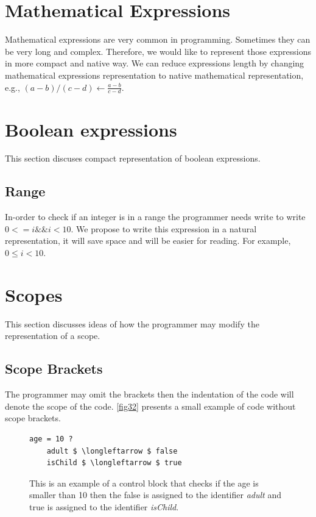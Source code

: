 \section{Mathematical Expressions}
Mathematical expressions are very common in programming. Sometimes they can be very long and complex. Therefore, we would like to represent those expressions in more compact and native way. We can reduce expressions length by changing mathematical expressions representation to native mathematical representation, e.g., $ (a-b)/(c-d) \longleftarrow \frac{a-b}{c-d} $.
\section{Boolean expressions}
This section discuses compact representation of boolean expressions.
\subsection{Range}
In-order to check if an integer is in a range the programmer needs write to write $ 0 <= i \&\& i < 10 $. We propose to write this expression in a natural representation, it will save space and will be easier for reading. For example, $ 0 \leq i < 10 $.
\section{Scopes}
This section discusses ideas of how the programmer may modify the representation of a scope.
\subsection{Scope Brackets}
The programmer may omit the brackets then the indentation of the code will denote the scope of the code. \autoref{fig32} presents a small example of code without scope brackets.
\begin{figure}[H]
\begin{lstlisting}
age = 10 ?
	adult $ \longleftarrow $ false
	isChild $ \longleftarrow $ true
\end{lstlisting}
\caption{This is an example of a control block that checks if the age is smaller than 10 then the false is assigned to the identifier \textit{adult} and true is assigned to the identifier \textit{isChild}.}
\label{fig32}
\end{figure}
